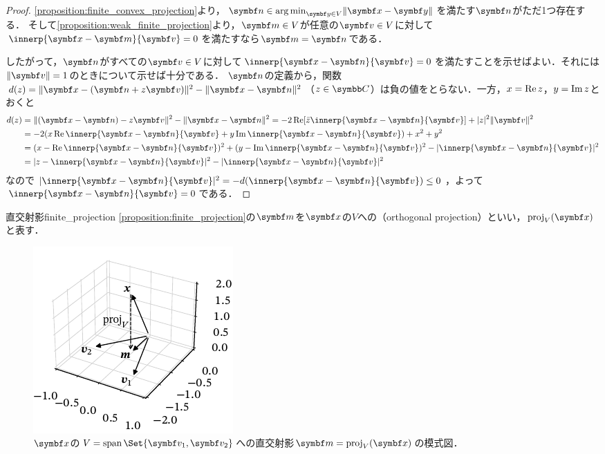 \documentclass[../../main]{subfiles}
\begin{document}
\begin{proof}
  \cref{proposition:finite_convex_projection}より，\(\vect{n}\in\argmin_{\vect{y}\in V}\vnorm{\vect{x}-\vect{y}}\)を満たす\(\vect{n}\)がただ1つ存在する．
  そして\cref{proposition:weak_finite_projection}より，\(\vect{m}\in V\)が任意の\(\vect{v}\in V\)に対して\(\innerp{\vect{x}-\vect{m}}{\vect{v}}=0\)を満たすなら\(\vect{m}=\vect{n}\)である．

  したがって，\(\vect{n}\)がすべての\(\vect{v}\in V\)に対して\(\innerp{\vect{x}-\vect{n}}{\vect{v}}=0\)を満たすことを示せばよい．それには\(\vnorm{\vect{v}}=1\)のときについて示せば十分である．
  \(\vect{n}\)の定義から，関数\(d(z)=\vnorm{\vect{x}-(\vect{n}+z\vect{v})}^2-\vnorm{\vect{x}-\vect{n}}^2\)（\(z\in\numset{C}\)）は負の値をとらない．一方，\(x=\operatorname{Re} z\)，\(y=\operatorname{Im} z\)とおくと
  \begin{align*}
    d(z) &= \vnorm{(\vect{x}-\vect{n})-z\vect{v}}^2-\vnorm{\vect{x}-\vect{n}}^2
    = -2\rpart[\conj{z}\innerp{\vect{x}-\vect{n}}{\vect{v}}]+\abs{z}^2\vnorm{\vect{v}}^2 \\
    &= -2(x\rpart\innerp{\vect{x}-\vect{n}}{\vect{v}}+y\ipart\innerp{\vect{x}-\vect{n}}{\vect{v}})+x^2+y^2 \\
    &= (x-\rpart\innerp{\vect{x}-\vect{n}}{\vect{v}})^2+(y-\ipart\innerp{\vect{x}-\vect{n}}{\vect{v}})^2-\abs{\innerp{\vect{x}-\vect{n}}{\vect{v}}}^2 \\
    &= \abs{z-\innerp{\vect{x}-\vect{n}}{\vect{v}}}^2-\abs{\innerp{\vect{x}-\vect{n}}{\vect{v}}}^2
  \end{align*}
  なので\(\abs{\innerp{\vect{x}-\vect{n}}{\vect{v}}}^2=-d(\innerp{\vect{x}-\vect{n}}{\vect{v}})\leq 0\)，よって\(\innerp{\vect{x}-\vect{n}}{\vect{v}}=0\)である．
\end{proof}

\begin{definition}{直交射影}{finite_projection}
  \cref{proposition:finite_projection}の\(\vect{m}\)を\(\vect{x}\)の\(V\)への（orthogonal projection）といい，\(\proj_V(\vect{x})\)と表す．
\end{definition}

\begin{figure}[htbp]
  \centering
  \includegraphics{figures/proj3d.pdf}
  \caption{\(\vect{x}\)の\(V=\spannedby\Set{\vect{v}_1,\vect{v}_2}\)への直交射影\(\vect{m}=\proj_V(\vect{x})\)の模式図．}
\end{figure}
\end{document}

